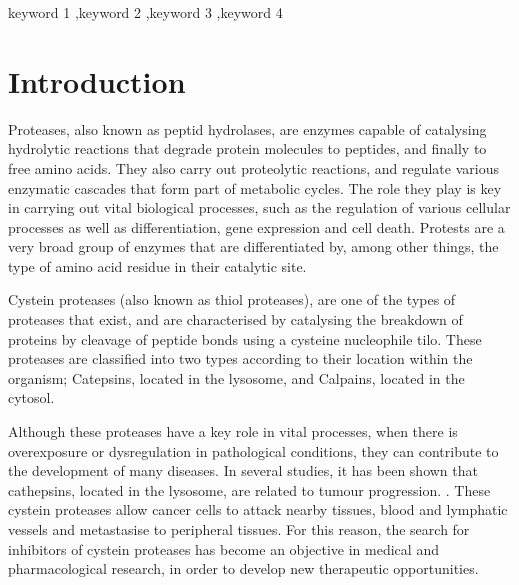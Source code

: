 \documentclass[final,times,twocolumn,article]{elsarticle}
\begin{document}
\begin{frontmatter}
\begin{keyword}
keyword 1 \sep keyword 2 \sep keyword 3 \sep keyword 4



\end{keyword}


\end{frontmatter}




\section{Introduction}
\label{introduction}

Proteases, also known as peptid hydrolases, are enzymes capable of catalysing hydrolytic reactions that degrade protein molecules to peptides, and finally to free amino acids. They also carry out proteolytic reactions, and regulate various enzymatic cascades that form part of metabolic cycles. \cite{Ramos2019} The role they play is key in carrying out vital biological processes, such as the regulation of various cellular processes as well as differentiation, gene expression and cell death. Protests are a very broad group of enzymes that are differentiated by, among other things, the type of amino acid residue in their catalytic site. \cite{Ramos2019}

Cystein proteases (also known as thiol proteases), are one of the types of proteases that exist, and are characterised by catalysing the breakdown of proteins by cleavage of peptide bonds using a cysteine nucleophile tilo. These proteases are classified into two types according to their location within the organism; Catepsins, located in the lysosome, and Calpains, located in the cytosol. \cite{Gupta2020}

Although these proteases have a key role in vital processes, when there is overexposure or dysregulation in pathological conditions, they can contribute to the development of many diseases.  In several studies, it has been shown that cathepsins, located in the lysosome, are related to tumour progression. \cite{Berdowska2004} \cite{Mohamed2006}. These cystein proteases allow cancer cells to attack nearby tissues, blood and lymphatic vessels and metastasise to peripheral tissues. \cite{Gupta2020} \cite{Gocheva2006} For this reason, the search for inhibitors of cystein proteases has become an objective in medical and pharmacological research, in order to develop new therapeutic opportunities. \cite{cath}
\end{document}

